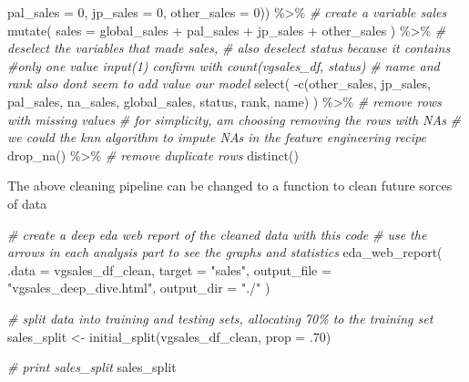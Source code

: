 \documentclass[
]{article}
\newenvironment{Shaded}{\begin{snugshade}}{\end{snugshade}}
\newcommand{\AttributeTok}[1]{\textcolor[rgb]{0.77,0.63,0.00}{#1}}
\newcommand{\CommentTok}[1]{\textcolor[rgb]{0.56,0.35,0.01}{\textit{#1}}}
\newcommand{\DecValTok}[1]{\textcolor[rgb]{0.00,0.00,0.81}{#1}}
\newcommand{\FunctionTok}[1]{\textcolor[rgb]{0.00,0.00,0.00}{#1}}
\newcommand{\NormalTok}[1]{#1}
\newcommand{\OtherTok}[1]{\textcolor[rgb]{0.56,0.35,0.01}{#1}}
\newcommand{\SpecialCharTok}[1]{\textcolor[rgb]{0.00,0.00,0.00}{#1}}
\newcommand{\StringTok}[1]{\textcolor[rgb]{0.31,0.60,0.02}{#1}}
\begin{document}
\begin{Shaded}
\begin{Highlighting}[]
                  \AttributeTok{pal\_sales =} \DecValTok{0}\NormalTok{,}
                  \AttributeTok{jp\_sales =} \DecValTok{0}\NormalTok{, }
                  \AttributeTok{other\_sales =} \DecValTok{0}\NormalTok{)) }\SpecialCharTok{\%\textgreater{}\%} 
  \CommentTok{\# create a variable sales}
  \FunctionTok{mutate}\NormalTok{(}
    \AttributeTok{sales =}\NormalTok{ global\_sales }\SpecialCharTok{+}\NormalTok{ pal\_sales }\SpecialCharTok{+}\NormalTok{ jp\_sales }\SpecialCharTok{+}\NormalTok{ other\_sales}
\NormalTok{    ) }\SpecialCharTok{\%\textgreater{}\%} 
  \CommentTok{\# deselect the variables that made sales, }
  \CommentTok{\# also deselect status because it contains }
  \CommentTok{\#only one value input(1) confirm with \textasciigrave{}count(vgsales\_df, status)\textasciigrave{}}
  \CommentTok{\# name and rank also dont seem to add value our model}
  \FunctionTok{select}\NormalTok{(}
    \SpecialCharTok{{-}}\FunctionTok{c}\NormalTok{(other\_sales, jp\_sales, pal\_sales, na\_sales, }
\NormalTok{       global\_sales, status, rank, name)}
\NormalTok{    ) }\SpecialCharTok{\%\textgreater{}\%} 
  \CommentTok{\# remove rows with missing values }
  \CommentTok{\# for simplicity, am choosing removing the rows with NA\textquotesingle{}s}
  \CommentTok{\# we could the knn algorithm to impute NA\textquotesingle{}s in the feature engineering recipe}
  \FunctionTok{drop\_na}\NormalTok{() }\SpecialCharTok{\%\textgreater{}\%} 
   \CommentTok{\# remove duplicate rows}
  \FunctionTok{distinct}\NormalTok{()}
\end{Highlighting}
\end{Shaded}

The above cleaning pipeline can be changed to a function to clean future
sorces of data

\begin{Shaded}
\begin{Highlighting}[]
\CommentTok{\# create a deep eda web report of the cleaned data with this code}
\CommentTok{\# use the arrows in each analysis part to see the graphs and statistics}
\FunctionTok{eda\_web\_report}\NormalTok{(}
  \AttributeTok{.data =}\NormalTok{ vgsales\_df\_clean, }
  \AttributeTok{target =} \StringTok{"sales"}\NormalTok{, }
  \AttributeTok{output\_file =} \StringTok{"vgsales\_deep\_dive.html"}\NormalTok{, }
  \AttributeTok{output\_dir =} \StringTok{"./"}
\NormalTok{)}
\end{Highlighting}
\end{Shaded}

\begin{Shaded}
\begin{Highlighting}[]
\CommentTok{\# split data into training and testing sets, allocating 70\% to the training set}
\NormalTok{sales\_split }\OtherTok{\textless{}{-}} \FunctionTok{initial\_split}\NormalTok{(vgsales\_df\_clean, }\AttributeTok{prop =}\NormalTok{ .}\DecValTok{70}\NormalTok{)}

\CommentTok{\# print sales\_split}
\NormalTok{sales\_split}
\end{Highlighting}
\end{Shaded}
\end{document}

